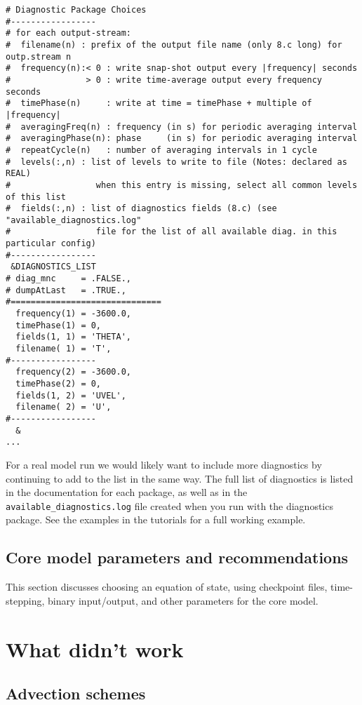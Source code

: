 \documentclass[11pt]{article}
\begin{document}
\begin{lstlisting}[caption={Example \texttt{data.diagnostics} file}, captionpos=b]
# Diagnostic Package Choices
#-----------------
# for each output-stream:
#  filename(n) : prefix of the output file name (only 8.c long) for outp.stream n
#  frequency(n):< 0 : write snap-shot output every |frequency| seconds
#               > 0 : write time-average output every frequency seconds
#  timePhase(n)     : write at time = timePhase + multiple of |frequency|
#  averagingFreq(n) : frequency (in s) for periodic averaging interval
#  averagingPhase(n): phase     (in s) for periodic averaging interval
#  repeatCycle(n)   : number of averaging intervals in 1 cycle
#  levels(:,n) : list of levels to write to file (Notes: declared as REAL)
#                 when this entry is missing, select all common levels of this list
#  fields(:,n) : list of diagnostics fields (8.c) (see "available_diagnostics.log"
#                 file for the list of all available diag. in this particular config)
#-----------------
 &DIAGNOSTICS_LIST
# diag_mnc     = .FALSE.,
# dumpAtLast   = .TRUE.,
#==============================
  frequency(1) = -3600.0,
  timePhase(1) = 0,
  fields(1, 1) = 'THETA',
  filename( 1) = 'T',
#-----------------
  frequency(2) = -3600.0,
  timePhase(2) = 0,
  fields(1, 2) = 'UVEL',
  filename( 2) = 'U',
#-----------------
  &
...
\end{lstlisting}
For a real model run we would likely want to include more diagnostics by continuing to add to the list in the same way. The full list of diagnostics is listed in the documentation for each package, as well as in the \verb|available_diagnostics.log| file created when you run with the diagnostics package. See the examples in the tutorials for a full working example.

\subsection{Core model parameters and recommendations}
This section discusses choosing an equation of state, using checkpoint files, time-stepping, binary input/output, and other parameters for the core model.

\section{What didn't work}
\subsection{Advection schemes}
\end{document}
